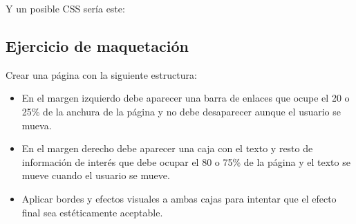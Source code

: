 \documentclass[letterpaper,10pt,spanish]{sphinxmanual}
\begin{document}
Y un posible CSS sería este:

\begin{sphinxVerbatim}[commandchars=\\\{\}]
   
   
    
   
   
   
\end{sphinxVerbatim}


\subsection{Ejercicio de maquetación}
\label{\detokenize{tema3:ejercicio-de-maquetacion}}
Crear una página con la siguiente estructura:
\begin{itemize}
\item {} 
En el margen izquierdo debe aparecer una barra de enlaces que ocupe el 20 o 25\% de la anchura de la página y no debe desaparecer aunque el usuario se mueva.

\item {} 
En el margen derecho debe aparecer una caja con el texto y resto de información de interés que debe ocupar el 80 o 75\% de la página y el texto se mueve cuando el usuario se mueve.

\item {} 
Aplicar bordes y efectos visuales a ambas cajas para intentar que el efecto final sea estéticamente aceptable.

\end{itemize}
\end{document}
